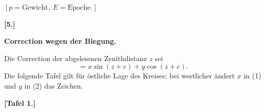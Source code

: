 \documentclass[12pt,a4paper]{article}
\theoremstyle{plain}
\theoremstyle{definition}
\theoremstyle{remark}
\begin{document}
\smallskip
\begin{center}
$[p = \text{Gewicht},\ E = \text{Epoche}.]$
\end{center}

\newpage
\begin{center}
\textbf{[5.]}
\end{center}

\begin{center}
\textbf{Correction wegen der Biegung.}
\end{center}

\medskip
Die Correction der abgelesenen Zenithdistanz $z$ sei
\[= x \sin(z+c) + y \cos(z+c).\]
Die folgende Tafel gilt f\"{u}r \"{o}stliche Lage des Kreises; bei westlicher \"{a}ndert $x$
in (1) und $y$ in (2) das Zeichen.

\begin{center}
\textbf{[Tafel 1.]}
\end{center}
\end{document}
